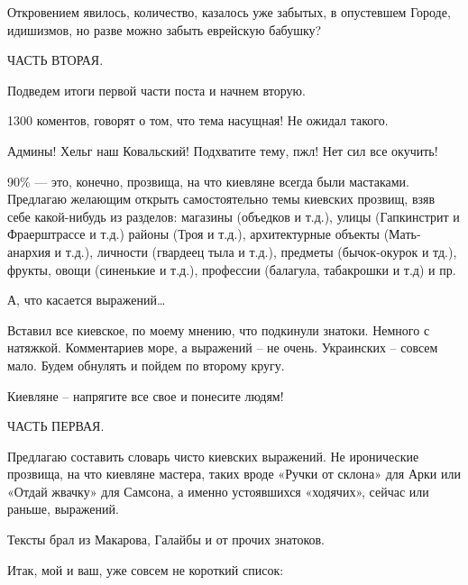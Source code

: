 Откровением явилось, количество, казалось уже забытых, в опустевшем Городе, идишизмов, но разве можно забыть еврейскую бабушку?

ЧАСТЬ ВТОРАЯ.

Подведем итоги первой части поста и начнем вторую.

1300 коментов, говорят о том, что тема насущная! Не ожидал такого. 

Админы! Хельг наш Ковальский! Подхватите тему, пжл! Нет сил все окучить! 

90\% — это, конечно, прозвища, на что киевляне всегда были мастаками. Предлагаю
желающим открыть самостоятельно темы киевских прозвищ, взяв себе какой-нибудь
из разделов: магазины (объедков и т.д.), улицы (Гапкинстрит и Фраерштрассе и
т.д.) районы (Троя и т.д.), архитектурные объекты (Мать-анархия и т.д.),
личности (гвардеец тыла и т.д.), предметы (бычок-окурок и тд.), фрукты, овощи
(синенькие и т.д.), профессии (балагула, табакрошки и т.д) и пр.

А, что касается выражений…

Вставил все киевское, по моему мнению, что подкинули знатоки. Немного с
натяжкой. Комментариев море, а выражений – не очень. Украинских – совсем мало.
Будем обнулять и пойдем по второму кругу. 

Киевляне – напрягите все свое и понесите людям!

ЧАСТЬ ПЕРВАЯ.

Предлагаю составить словарь чисто киевских выражений. Не иронические прозвища,
на что киевляне мастера, таких вроде «Ручки от склона» для Арки или «Отдай
жвачку» для Самсона, а именно устоявшихся «ходячих», сейчас или раньше,
выражений. 

Тексты брал из Макарова, Галайбы и от прочих знатоков.

Итак, мой и ваш, уже совсем не короткий список:

